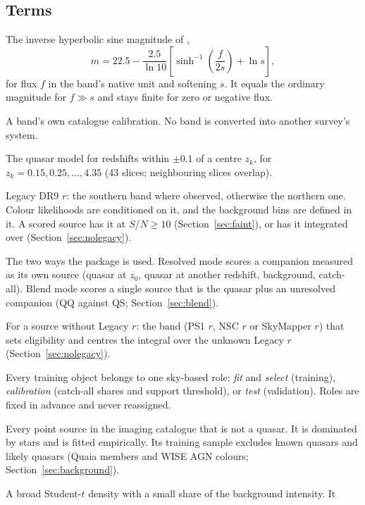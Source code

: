\documentclass[11pt,a4paper]{article}
\begin{document}
\subsection{Terms}
\begin{description}\small
\item[Luptitude.] The inverse hyperbolic sine magnitude of \citet{Lupton1999},
  \[m=22.5-\frac{2.5}{\ln 10}\left[\sinh^{-1}\!\left(\frac{f}{2s}\right)+\ln s\right],\]
  for flux $f$ in the band's native unit and softening $s$. It equals the ordinary magnitude for $f\gg s$ and stays finite for zero or negative flux.
\item[Native system.] A band's own catalogue calibration. No band is converted into another survey's system.
\item[Slice.] The quasar model for redshifts within $\pm0.1$ of a centre $z_k$, for $z_k=0.15,0.25,\dots,4.35$ (43 slices; neighbouring slices overlap).
\item[Reference band.] Legacy DR9 $r$: the southern band where observed, otherwise the northern one.
  Colour likelihoods are conditioned on it, and the background bins are defined in it. A scored source
  has it at $S/N\geq10$ (Section~\ref{sec:faint}), or has it integrated over (Section~\ref{sec:nolegacy}).
\item[Resolved mode, blend mode.] The two ways the package is used. Resolved mode scores a companion measured
  as its own source (quasar at $z_0$, quasar at another redshift, background, catch-all). Blend mode scores a
  single source that is the quasar plus an unresolved companion (QQ against QS; Section~\ref{sec:blend}).
\item[Fallback band.] For a source without Legacy $r$: the band (PS1 $r$, NSC $r$ or SkyMapper $r$) that sets
  eligibility and centres the integral over the unknown Legacy $r$ (Section~\ref{sec:nolegacy}).
\item[Role.] Every training object belongs to one sky-based role: \emph{fit} and \emph{select} (training),
  \emph{calibration} (catch-all shares and support threshold), or \emph{test} (validation). Roles are fixed
  in advance and never reassigned.
\item[Background.] Every point source in the imaging catalogue that is not a quasar. It is dominated
  by stars and is fitted empirically. Its training sample excludes known quasars and likely quasars
  (Quaia members and WISE AGN colours; Section~\ref{sec:background}).
\item[Catch-all.] A broad Student-$t$ density with a small share of the background intensity. It

\end{description}
\end{document}
